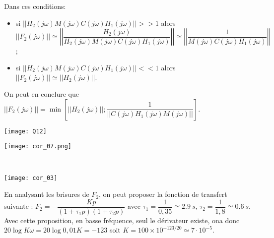 \begin{multicols}{2}
\begin{corrige}
Dans ces conditions: 
\begin{itemize} 
\item si $\left|\left|{H_2(j\omega)M(j\omega)C(j\omega)H_1(j\omega)}\right|\right|>>1$ alors  $||F_2(j\omega)||\simeq \left|\left|\dfrac{H_2(j\omega)}{H_2(j\omega)M(j\omega)C(j\omega)H_1(j\omega)}\right|\right|\simeq \left|\left|\dfrac{1}{M(j\omega)C(j\omega)H_1(j\omega)}\right|\right|$;
\item si $\left|\left|{H_2(j\omega)M(j\omega)C(j\omega)H_1(j\omega)}\right|\right|<<1$ alors  $||F_2(j\omega)||\simeq \left|\left|{H_2(j\omega)}\right|\right|$.
\end{itemize}

On peut en conclure que $||F_2(j \omega)|| = \min \left[ ||H_2(j \omega) || ; \dfrac{1}{||C(j\omega) H_1(j \omega) M(j\omega)||}\right]$.
\end{corrige}
\else
\fi




\ifprof
\else
\begin{center}
\texttt{[image: Q12]}
\end{center}
\fi

\ifprof
\begin{corrige}
\begin{center}
\texttt{[image: cor\_07.png]}
\end{center}
\end{corrige}
\else
\fi



\ifprof
\begin{corrige} ~\\
\begin{center}
\texttt{[image: cor\_03]}
\end{center}

En analysant les brisures de $F_2$, on peut proposer la fonction de transfert suivante : 
$F_2 = -\dfrac{Kp}{\left(1+\tau_1 p\right)\left(1+\tau_2 p\right)}$ avec $\tau_1 = \dfrac{1}{0,35}\simeq \SI{2,9}{s}$, $\tau_2 = \dfrac{1}{1,8}\simeq \SI{0,6}{s}$. Avec cette proposition, en basse fréquence, seul le dérivateur existe, ona donc  $20 \log K\omega =20\log  0,01K = -123$ soit $K = 100\times 10 ^{-123/20}\simeq 7 \cdot 10^{-5}$. 


\end{corrige}
\end{multicols}
